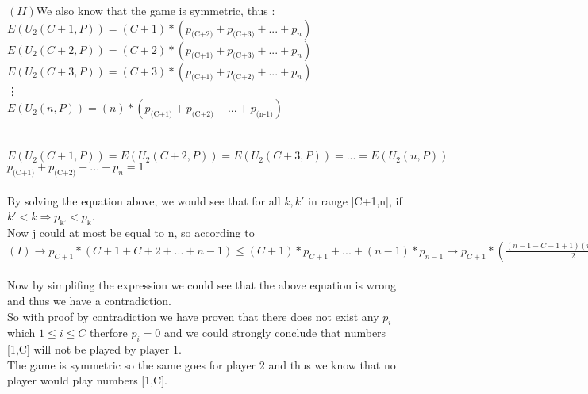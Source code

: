 \begin{enumerate}
\begin{latin}
                                $(II)$We also know that the game is symmetric, thus : \\ 
                                $E(U_2(C+1,P)) = (C+1)*(p_\text{(C+2)}+p_\text{(C+3)}+...+p_n)$\\
                                $E(U_2(C+2,P)) = (C+2)*(p_\text{(C+1)}+p_\text{(C+3)}+...+p_n)$\\
                                $E(U_2(C+3,P)) = (C+3)*(p_\text{(C+1)}+p_\text{(C+2)}+...+p_n)$\\
                                \vdots \\
                                $E(U_2(n,P)) = (n)*(p_\text{(C+1)}+p_\text{(C+2)}+...+p_\text{(n-1)})$\\ \\ \\
                                $E(U_2(C+1,P)) = E(U_2(C+2,P)) = E(U_2(C+3,P)) = ... = E(U_2(n,P))$ \\ 
                                $p_\text{(C+1)} + p_\text{(C+2)} + ... + p_n = 1$ \\ \\
                                By solving the equation above, we would see that for all $k,k'$ in range [C+1,n], if $k' < k \Rightarrow p_\text{k'} < p_\text{k}$.\\
                                Now j could at most be equal to n, so according to $(I) \rightarrow p_{C+1} * (C+1 + C + 2 + ... + n-1) \leq (C+1) * p_{C+1} + ... + (n-1)*p_{n-1} \rightarrow p_{C+1} * (\frac{(n-1-C-1+1)(n-1+C+1)}{2}) \leq i \leq C = \lfloor n - \frac{\sqrt[]{8n+1}-1}{2} \rfloor$\\ \\
                                Now by simplifing the expression we could see that the above equation is wrong and thus we have a contradiction. \\
                                So with proof by contradiction we have proven that there does not exist any $p_i$ which $1 \leq i \leq C$ therfore $p_i = 0$ and we could strongly conclude that 
                                numbers [1,C] will not be played by player 1.\\
                                The game is symmetric so the same goes for player 2 and thus we know that no player would play numbers [1,C].
                                
            \end{latin}
          
        \end{enumerate}